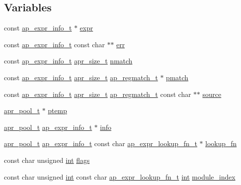 \subsection*{Variables}
\begin{DoxyCompactItemize}
\item 
const \hyperlink{structap__expr__info__t}{ap\+\_\+expr\+\_\+info\+\_\+t} $\ast$ \hyperlink{group__AP__EXPR_ga678330dc2f7e5114b38824a310f676ed}{expr}
\item 
const \hyperlink{structap__expr__info__t}{ap\+\_\+expr\+\_\+info\+\_\+t} const char $\ast$$\ast$ \hyperlink{group__AP__EXPR_gaccebe6c638c552d2845014cf8bdea8d8}{err}
\item 
const \hyperlink{structap__expr__info__t}{ap\+\_\+expr\+\_\+info\+\_\+t} \hyperlink{group__apr__platform_gaaa72b2253f6f3032cefea5712a27540e}{apr\+\_\+size\+\_\+t} \hyperlink{group__AP__EXPR_ga92a43aa0352eb452970c83ba3da95a8f}{nmatch}
\item 
const \hyperlink{structap__expr__info__t}{ap\+\_\+expr\+\_\+info\+\_\+t} \hyperlink{group__apr__platform_gaaa72b2253f6f3032cefea5712a27540e}{apr\+\_\+size\+\_\+t} \hyperlink{structap__regmatch__t}{ap\+\_\+regmatch\+\_\+t} $\ast$ \hyperlink{group__AP__EXPR_ga144e8a242b3028b194fd8f301b15078b}{pmatch}
\item 
const \hyperlink{structap__expr__info__t}{ap\+\_\+expr\+\_\+info\+\_\+t} \hyperlink{group__apr__platform_gaaa72b2253f6f3032cefea5712a27540e}{apr\+\_\+size\+\_\+t} \hyperlink{structap__regmatch__t}{ap\+\_\+regmatch\+\_\+t} const char $\ast$$\ast$ \hyperlink{group__AP__EXPR_ga0e8eb33ac3362aea4e83d2c415b2dc17}{source}
\item 
\hyperlink{structapr__pool__t}{apr\+\_\+pool\+\_\+t} $\ast$ \hyperlink{group__AP__EXPR_gaab85d20515306c350c88fbc8f58673b7}{ptemp}
\item 
\hyperlink{structapr__pool__t}{apr\+\_\+pool\+\_\+t} \hyperlink{structap__expr__info__t}{ap\+\_\+expr\+\_\+info\+\_\+t} $\ast$ \hyperlink{group__AP__EXPR_gae5e165b68fbb12afc88707b8e6eb2f08}{info}
\item 
\hyperlink{structapr__pool__t}{apr\+\_\+pool\+\_\+t} \hyperlink{structap__expr__info__t}{ap\+\_\+expr\+\_\+info\+\_\+t} const char \hyperlink{group__AP__EXPR_gad1cddcb03e188322dedbc6021e12f7ea}{ap\+\_\+expr\+\_\+lookup\+\_\+fn\+\_\+t} $\ast$ \hyperlink{group__AP__EXPR_ga93d947e1eae744a3ca2acd84e9133f45}{lookup\+\_\+fn}
\item 
const char unsigned \hyperlink{pcre_8txt_a42dfa4ff673c82d8efe7144098fbc198}{int} \hyperlink{group__AP__EXPR_gad7a10cd81a384ff727296d05bb827806}{flags}
\item 
const char unsigned \hyperlink{pcre_8txt_a42dfa4ff673c82d8efe7144098fbc198}{int} const char \hyperlink{group__AP__EXPR_gad1cddcb03e188322dedbc6021e12f7ea}{ap\+\_\+expr\+\_\+lookup\+\_\+fn\+\_\+t} \hyperlink{pcre_8txt_a42dfa4ff673c82d8efe7144098fbc198}{int} \hyperlink{group__AP__EXPR_gaebe144cbe4474da9d8a21f71bee43251}{module\+\_\+index}
\end{DoxyCompactItemize}


